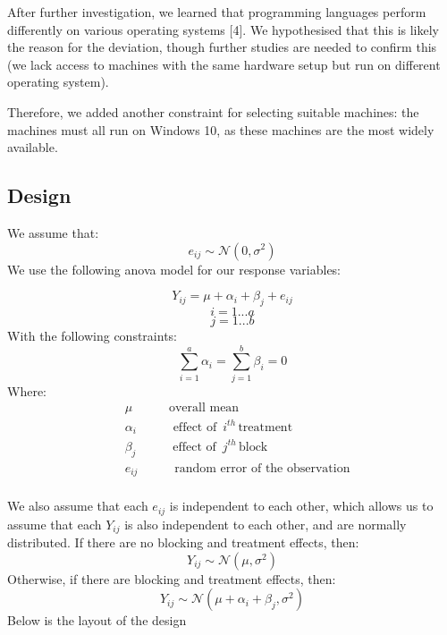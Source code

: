 \documentclass[12pt,halfline,a4paper,]{ouparticle}
\begin{document}
After further investigation, we learned that programming languages
perform differently on various operating systems {[}4{]}. We
hypothesised that this is likely the reason for the deviation, though
further studies are needed to confirm this (we lack access to machines
with the same hardware setup but run on different operating system).

Therefore, we added another constraint for selecting suitable machines:
the machines must all run on Windows 10, as these machines are the most
widely available.

\hypertarget{design}{%
\subsection{Design}\label{design}}

We assume that: \[
e_{ij} \sim \mathcal{N}(0, \sigma^2)
\] We use the following anova model for our response variables:

\[
Y_{ij} = \mu + \alpha_i + \beta_j+ e_{ij}
\] \[
i = 1 ...a
\] \[
j = 1 ...b
\] With the following constraints: \[
\sum_{i=1}^a \alpha_i = \sum_{j=1}^b \beta_i =0 
\] Where: \[
\begin{aligned}
&\mu\hspace{35pt}  \text{overall mean} \\
&\alpha_i\hspace{35pt} \text{effect of }\, i^{th}\, \text{treatment}\\
&\beta_j\hspace{35pt} \text{effect of }\, j^{th}\, \text{block}\\
&e_{ij}\hspace{35pt} \text{random error of the observation}\\
\end{aligned}
\]

We also assume that each \(e_{ij}\) is independent to each other, which
allows us to assume that each \(Y_{ij}\) is also independent to each
other, and are normally distributed. If there are no blocking and
treatment effects, then: \[
Y_{ij} \sim \mathcal{N}(\mu, \sigma^2)
\] Otherwise, if there are blocking and treatment effects, then: \[
Y_{ij} \sim \mathcal{N}(\mu + \alpha_i + \beta_j, \sigma^2)
\] Below is the layout of the design
\end{document}
